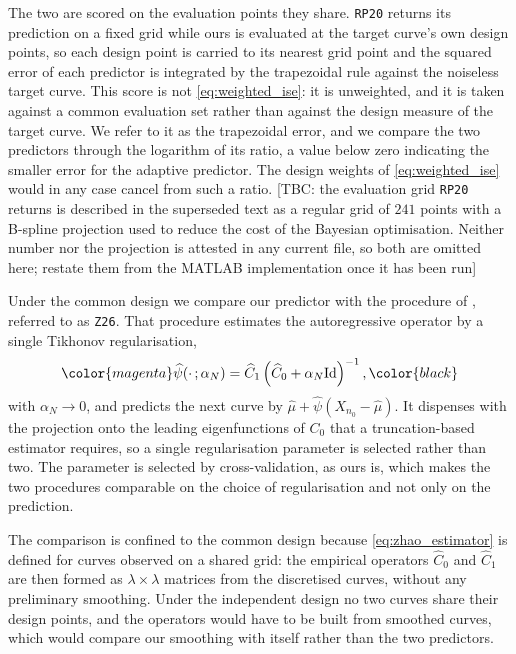 The two are scored on the evaluation points they share. \texttt{RP20} returns its prediction on a fixed grid while ours is evaluated at the target curve's own design points, so each design point is carried to its nearest grid point and the squared error of each predictor is integrated by the trapezoidal rule against the noiseless target curve. This score is not \eqref{eq:weighted_ise}: it is unweighted, and it is taken against a common evaluation set rather than against the design measure of the target curve. We refer to it as the trapezoidal error, and we compare the two predictors through the logarithm of its ratio, a value below zero indicating the smaller error for the adaptive predictor. The design weights of \eqref{eq:weighted_ise} would in any case cancel from such a ratio.
[TBC: the evaluation grid \texttt{RP20} returns is described in the superseded text as a regular grid of $241$ points with a B-spline projection used to reduce the cost of the Bayesian optimisation. Neither number nor the projection is attested in any current file, so both are omitted here; restate them from the MATLAB implementation once it has been run]

Under the common design we compare our predictor with the procedure of \citet{zhao2026functional}, referred to as \texttt{Z26}. That procedure estimates the autoregressive operator by a single Tikhonov regularisation,
\color{black}
\begin{equation}\label{eq:zhao_estimator}
	\color{magenta}\widehat{\psi}(\cdot\,;\alpha_N) = \widehat{C}_1 \left(\widehat{C}_0 + \alpha_N \mathrm{Id}\right)^{-1},\color{black}
\end{equation}
\color{magenta}
with $\alpha_N \to 0$, and predicts the next curve by $\widehat\mu + \widehat\psi(X_{n_0} - \widehat\mu)$. It dispenses with the projection onto the leading eigenfunctions of $C_0$ that a truncation-based estimator requires, so a single regularisation parameter is selected rather than two. The parameter is selected by cross-validation, as ours is, which makes the two procedures comparable on the choice of regularisation and not only on the prediction.

The comparison is confined to the common design because \eqref{eq:zhao_estimator} is defined for curves observed on a shared grid: the empirical operators $\widehat{C}_0$ and $\widehat{C}_1$ are then formed as $\lambda \times \lambda$ matrices from the discretised curves, without any preliminary smoothing. Under the independent design no two curves share their design points, and the operators would have to be built from smoothed curves, which would compare our smoothing with itself rather than the two predictors.

